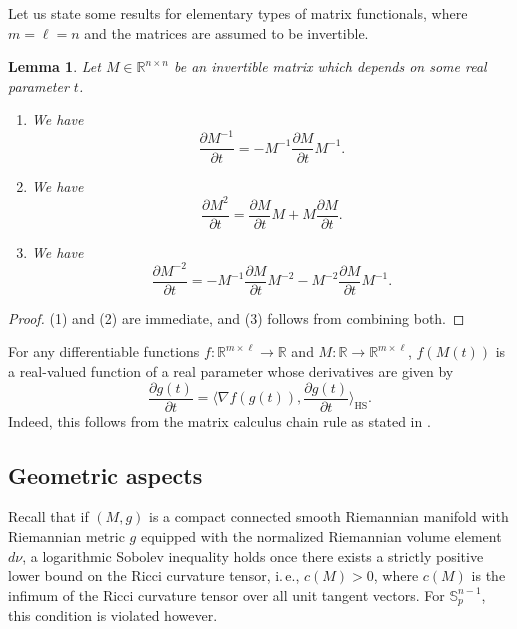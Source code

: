 \documentclass[a4paper,12pt]{amsart}
\numberwithin{equation}{section}
\newtheorem{lemma}[satz]{Lemma}
\theoremstyle{remark}
\def\R{{\mathbb R}}
\def\S{{\mathbb S}}
\begin{document}
Let us state some results for elementary types of matrix functionals, where $m=\ell=n$ and the matrices are assumed to be invertible.

\begin{lemma}\label{ElemDer}
Let $M \in \R^{n \times n}$ be an invertible matrix which depends on some real parameter $t$.
    \begin{enumerate}
        \item We have
        \[
        \frac{\partial M^{-1}}{\partial t} = -M^{-1} \frac{\partial M}{\partial t} M^{-1}.
        \]
        \item We have
        \[
        \frac{\partial M^2}{\partial t} = \frac{\partial M}{\partial t} M + M \frac{\partial M}{\partial t}.
        \]
        \item We have
        \[
        \frac{\partial M^{-2}}{\partial t} = -M^{-1} \frac{\partial M}{\partial t} M^{-2} - M^{-2} \frac{\partial M}{\partial t} M^{-1}.
        \]
    \end{enumerate}
\end{lemma}

\begin{proof}
    (1) and (2) are immediate, and (3) follows from combining both.
\end{proof}

For any differentiable functions $f \colon \R^{m \times \ell} \to \R$ and $M \colon \R \to \R^{m \times \ell}$, $f(M(t))$ is a real-valued function of a real parameter whose derivatives are given by
\begin{equation}\label{MatrixChain}
	\frac{\partial g(t)}{\partial t} = \Big\langle \nabla f(g(t)), \frac{\partial g(t)}{\partial t} \Big\rangle_\mathrm{HS}.
\end{equation}
Indeed, this follows from the matrix calculus chain rule as stated in \cite[Lem.\ 2.2 (2)]{GS23}.

\subsection{Geometric aspects}\label{sec:Geom}

Recall that if $(M,g)$ is a compact connected smooth Riemannian manifold with Riemannian metric $g$ equipped with the normalized Riemannian volume element $d\nu$, a logarithmic Sobolev inequality holds once there exists a strictly positive lower bound on the Ricci curvature tensor, i.\,e., $c(M) > 0$, where $c(M)$ is the infimum of the Ricci curvature tensor over all unit tangent vectors. For $\S_p^{n-1}$, this condition is violated however.
\end{document}
